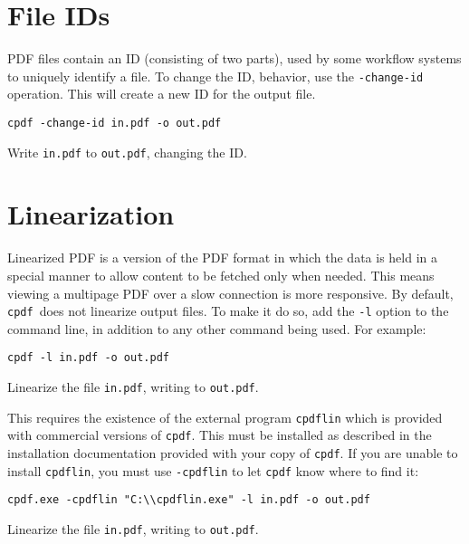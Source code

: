 \documentclass{book}
\newcommand{\cpdf}{\texttt{cpdf}}
\begin{document}
\section{File IDs}
PDF files contain an ID (consisting of two parts), used by some workflow
systems to uniquely identify a file. To change the ID, behavior, use the
\texttt{-change-id} operation. This will create a new ID for the output file. 

\begin{framed}
\small\verb!cpdf -change-id in.pdf -o out.pdf!

\vspace{2.5mm}
\noindent Write \texttt{in.pdf} to \texttt{out.pdf}, changing the ID.
\end{framed}

\section{Linearization}
Linearized PDF is a version of the PDF format in which the data is held in a
special manner to allow content to be fetched only when needed. This means
viewing a multipage PDF over a slow connection is more responsive. By default,
\cpdf\ does not linearize output files. To make it do so, add the \texttt{-l}
option to the command line, in addition to any other command being used. For example:

\begin{framed}
\small\verb!cpdf -l in.pdf -o out.pdf!

\vspace{2.5mm}
\noindent Linearize the file \texttt{in.pdf}, writing to \texttt{out.pdf}.
\end{framed}

\noindent This requires the existence of the external program \texttt{cpdflin} which is provided with commercial versions of \texttt{cpdf}. This must be installed as described in the installation documentation provided with your copy of \texttt{cpdf}. If you are unable to install \texttt{cpdflin}, you must use \texttt{-cpdflin} to let \texttt{cpdf} know where to find it:

\begin{framed}
\small\verb!cpdf.exe -cpdflin "C:\\cpdflin.exe" -l in.pdf -o out.pdf!

\vspace{2.5mm}
\noindent Linearize the file \texttt{in.pdf}, writing to \texttt{out.pdf}.
\end{framed}
\end{document}
